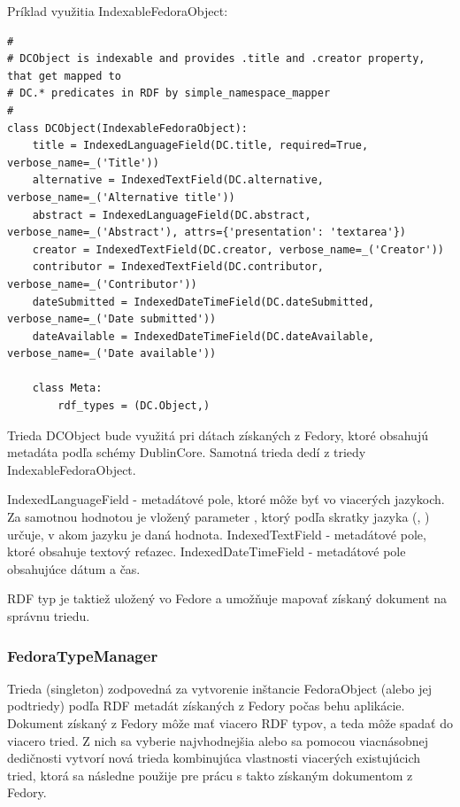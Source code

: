 \documentclass[thesis=M,slovak]{FITthesis}[2013/05/06]
\begin{document}
Príklad využitia IndexableFedoraObject:
\begin{lstlisting}[frame=single] 
#
# DCObject is indexable and provides .title and .creator property, that get mapped to
# DC.* predicates in RDF by simple_namespace_mapper
#
class DCObject(IndexableFedoraObject):
    title = IndexedLanguageField(DC.title, required=True, verbose_name=_('Title'))
    alternative = IndexedTextField(DC.alternative, verbose_name=_('Alternative title'))
    abstract = IndexedLanguageField(DC.abstract, verbose_name=_('Abstract'), attrs={'presentation': 'textarea'})
    creator = IndexedTextField(DC.creator, verbose_name=_('Creator'))
    contributor = IndexedTextField(DC.contributor, verbose_name=_('Contributor'))
    dateSubmitted = IndexedDateTimeField(DC.dateSubmitted, verbose_name=_('Date submitted'))
    dateAvailable = IndexedDateTimeField(DC.dateAvailable, verbose_name=_('Date available'))

    class Meta:
        rdf_types = (DC.Object,)
\end{lstlisting}

Trieda DCObject bude využitá pri dátach získaných z Fedory, ktoré obsahujú metadáta podľa schémy DublinCore. Samotná trieda dedí z triedy IndexableFedoraObject.

IndexedLanguageField - metadátové pole, ktoré môže byť vo viacerých jazykoch. Za samotnou hodnotou je vložený parameter , ktorý podľa skratky jazyka (, ) určuje, v akom jazyku je daná hodnota.
IndexedTextField - metadátové pole, ktoré obsahuje textový reťazec.
IndexedDateTimeField - metadátové pole obsahujúce dátum a čas.

RDF typ je taktiež uložený vo Fedore a umožňuje mapovať získaný dokument na správnu triedu.

\subsubsection{FedoraTypeManager}
Trieda (singleton) zodpovedná za vytvorenie inštancie FedoraObject (alebo jej podtriedy) podľa RDF metadát získaných z Fedory počas behu aplikácie. Dokument získaný z Fedory môže mať viacero RDF typov, a teda môže spadať do viacero tried. Z nich sa vyberie najvhodnejšia alebo sa pomocou viacnásobnej dedičnosti vytvorí nová trieda kombinujúca vlastnosti viacerých existujúcich tried,  ktorá sa následne použije pre prácu s takto získaným dokumentom z Fedory.
\end{document}
